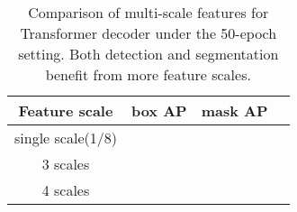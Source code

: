 \documentclass[10pt,twocolumn,letterpaper]{article}
\begin{document}
\begin{table*}[t]
\begin{adjustbox}{width=1.0\textwidth,center}
\begin{minipage}[t]{0.42\textwidth}
\begin{tabular}{c|ccc}
    \toprule
   Feature scale & box AP & {mask AP}  \\
        \midrule
    single scale(1/8)     &      &   \\
     3 scales  &  &    \\
    4 scales &  &      \\
    \bottomrule
\end{tabular}
\caption{Comparison of multi-scale features for Transformer decoder under the 50-epoch setting. Both detection and segmentation benefit from more feature scales.}
\label{tab:feature_scale}
\end{minipage}\hspace{3mm}

\end{adjustbox}
\vspace{-.3cm}
\end{table*}
\end{document}

